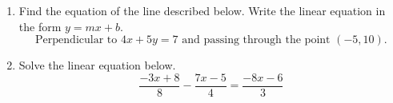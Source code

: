 \documentclass[14pt]{extbook}
\begin{document}
\begin{enumerate}
{\begin{center}
\end{center}
} \newpage
\item{
Find the equation of the line described below. Write the linear equation in the form $y=mx+b$.\[ \text{Perpendicular to } 4 x + 5 y = 7 \text{ and passing through the point } (-5, 10). \]} \newpage
\item{
Solve the linear equation below.\[ \frac{-3x + 8}{8} - \frac{7x -5}{4} = \frac{-8x -6}{3} \]} \newpage
\end{enumerate}
\end{document}
